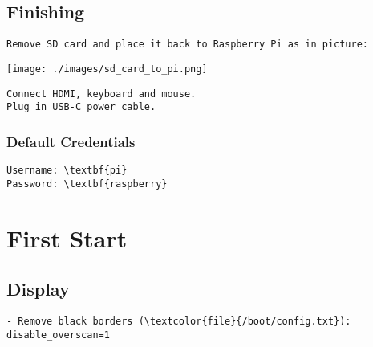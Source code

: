\documentclass[10pt, a4paper, onecolumn, openany]{book} %
\begin{document}


\section{Finishing}
\begin{Verbatim}[commandchars=\\\{\}]
Remove SD card and place it back to Raspberry Pi as in picture:
\end{Verbatim}
\begin{center}
    \texttt{[image: ./images/sd\_card\_to\_pi.png]}
\end{center}
\begin{Verbatim}[commandchars=\\\{\}]
Connect HDMI, keyboard and mouse.
Plug in USB-C power cable.
\end{Verbatim}

\subsection{Default Credentials}
\begin{Verbatim}[commandchars=\\\{\}]
Username: \textbf{pi}
Password: \textbf{raspberry}
\end{Verbatim}


\chapter{First Start}
\section{Display}
\begin{Verbatim}[commandchars=\\\{\}]
- Remove black borders (\textcolor{file}{/boot/config.txt}):
disable_overscan=1
\end{Verbatim}
\end{document}
